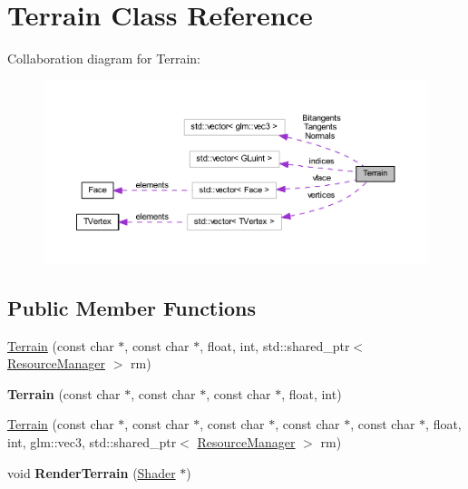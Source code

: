 \hypertarget{class_terrain}{}\section{Terrain Class Reference}
\label{class_terrain}


Collaboration diagram for Terrain\+:
\nopagebreak
\begin{figure}[H]
\begin{center}
\leavevmode
\includegraphics[width=350pt]{class_terrain__coll__graph}
\end{center}
\end{figure}
\subsection*{Public Member Functions}
\begin{DoxyCompactItemize}
\item 
\hyperlink{class_terrain_ad3a03e8d4b1626e8298d221287b6d438}{Terrain} (const char $\ast$, const char $\ast$, float, int, std\+::shared\+\_\+ptr$<$ \hyperlink{class_resource_manager}{Resource\+Manager} $>$ rm)
\item 
{\bfseries Terrain} (const char $\ast$, const char $\ast$, const char $\ast$, float, int)\hypertarget{class_terrain_a773721198ddf5c39119ba6f624e0affc}{}\label{class_terrain_a773721198ddf5c39119ba6f624e0affc}

\item 
\hyperlink{class_terrain_abb4f0ecaaa595f22d7a7784df43ecf4d}{Terrain} (const char $\ast$, const char $\ast$, const char $\ast$, const char $\ast$, const char $\ast$, float, int, glm\+::vec3, std\+::shared\+\_\+ptr$<$ \hyperlink{class_resource_manager}{Resource\+Manager} $>$ rm)
\item 
void {\bfseries Render\+Terrain} (\hyperlink{class_shader}{Shader} $\ast$)\hypertarget{class_terrain_a6cf30a9183c0c4f8db0dd320d2302a46}{}\label{class_terrain_a6cf30a9183c0c4f8db0dd320d2302a46}

\end{DoxyCompactItemize}
